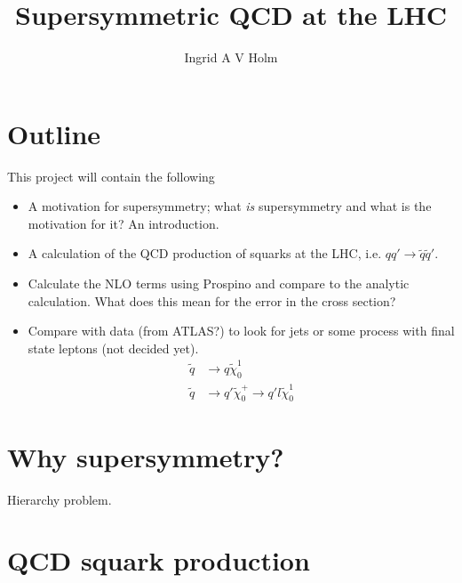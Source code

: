 \documentclass[11pt]{article}
\begin{document}
\title{Supersymmetric QCD at the LHC}
\author{Ingrid A V Holm}
\maketitle

\section*{Outline}
\begin{flushleft}
This project will contain the following
\begin{itemize}
\item A motivation for supersymmetry; what \textit{is} supersymmetry and what is the motivation for it? An introduction.
\item A calculation of the QCD production of squarks at the LHC, i.e. $qq' \rightarrow \tilde{q} \tilde{q}'$.
\item Calculate the NLO terms using Prospino \cite{beenakker1996prospino} and compare to the analytic calculation. What does this mean for the error in the cross section?
\item Compare with data (from ATLAS?) to look for jets or some process with final state leptons (not decided yet). 
\begin{align*}
\tilde{q} &\rightarrow q \tilde{\chi}_0^1\\
\tilde{q} &\rightarrow q' \tilde{\chi}_0^+ \rightarrow q' l \tilde{\chi}_0^1
\end{align*}
\end{itemize}
\end{flushleft}

\section{Why supersymmetry?}

\begin{flushleft}
Hierarchy problem.
\end{flushleft}

\pagebreak

\section{QCD squark production}
\end{document}

